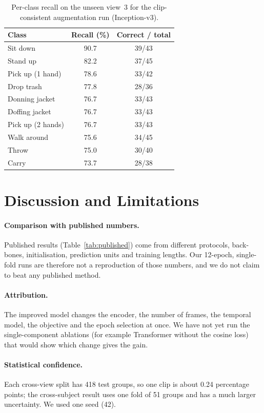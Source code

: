 \documentclass[runningheads]{llncs}
\begin{document}
\begin{table}[t]
\caption{Per-class recall on the unseen view~3 for the clip-consistent augmentation run (Inception-v3).}\label{tab:perclass}
\centering
\small
\begin{tabular}{lcc}
\toprule
Class & Recall (\%) & Correct / total \\
\midrule
Sit down & 90.7 & 39/43 \\
Stand up & 82.2 & 37/45 \\
Pick up (1 hand) & 78.6 & 33/42 \\
Drop trash & 77.8 & 28/36 \\
Donning jacket & 76.7 & 33/43 \\
Doffing jacket & 76.7 & 33/43 \\
Pick up (2 hands) & 76.7 & 33/43 \\
Walk around & 75.6 & 34/45 \\
Throw & 75.0 & 30/40 \\
Carry & 73.7 & 28/38 \\
\bottomrule
\end{tabular}
\end{table}

\section{Discussion and Limitations}\label{sec:discussion}
\paragraph{Comparison with published numbers.} Published results (Table~\ref{tab:published}) come from different protocols, back-bones, initialisation, prediction units and training lengths. Our 12-epoch, single-fold runs are therefore not a reproduction of those numbers, and we do not claim to beat any published method.

\paragraph{Attribution.} The improved model changes the encoder, the number of frames, the temporal model, the objective and the epoch selection at once. We have not yet run the single-component ablations (for example Transformer without the cosine loss) that would show which change gives the gain.

\paragraph{Statistical confidence.} Each cross-view split has 418 test groups, so one clip is about 0.24 percentage points; the cross-subject result uses one fold of 51 groups and has a much larger uncertainty. We used one seed (42).
\end{document}
